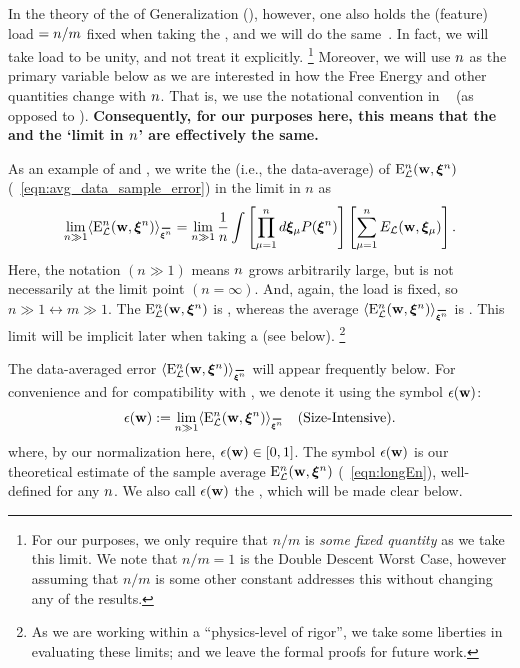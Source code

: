 In the theory of the \StatisticalMechanics of Generalization (\SMOG), however, one also holds the (feature) load $=n/m$ fixed when taking the \ThermodynamicLimit, and we will do the same~\cite{Gardner_1985, SST92, engel2001statistical,MM17_TR}. In fact, we will take load to be unity, and not treat it explicitly. \footnote{For our purposes, we only require that $n/m$ is \emph{some fixed quantity} as we take this limit. We note that $n/m = 1$ is the Double Descent Worst Case, however assuming that $n / m$ is some other constant addresses this without changing any of the results.}
Moreover,  we will use $n$ as the primary variable below as we are interested in how the Free Energy and other quantities change with $n$. That is, we use the notational convention in ~\cite{Solla2023} (as opposed to \cite{SST92}). \textbf{Consequently, for our purposes here, this means that the \ThermodynamicLimit and the `\LargeN limit in $n$' are effectively the same.}

As an example of \SizeExtensivity and \SizeIntensivity, 
we write the \ExpectedValue (i.e., the data-average) of \DataSampleError $\mathbf{\mathrm{E}}^{n}_{\mathcal{L}}(\mathbf{w}, \boldsymbol{\xi}^{n})$ (\EQN~\ref{eqn:avg_data_sample_error})
in the \LargeN limit in $n$ as
\begin{align}
\label{eqn:longEn}
  \lim_{n\gg 1} 
  \langle \DETOPXI\rangle_{\AVGNDXIn}=
  \lim_{n\gg 1}\frac{1}{\ND}
\int \left[ \prod_{\mu=1}^{\ND}d\XI_{\mu}P(\NDXIn) \right]
\left[ \sum_{\mu=1}^{\ND}\DEL(\WVEC,\XI_{\mu}) \right].
\end{align}
Here, the notation $(n \gg 1)$ means $n$ grows arbitrarily large, but is not necessarily
at the limit point $(n=\infty)$. And, again, the load is fixed, so $n\gg 1 \leftrightarrow m \gg 1$.
The \TotalDataSampleError $\mathbf{\mathrm{E}}^{n}_{\mathcal{L}}(\mathbf{w}, \boldsymbol{\xi}^{n})$ is \SizeExtensive, whereas the
average $\langle\DETOPXI\rangle_{\AVGNDXIn}$ is \SizeIntensive.
This limit will be implicit later when taking a \SaddlePointApproximation (see below).
\footnote{As we are working within a ``physics-level of rigor'', we take some liberties in evaluating these \LargeN limits; and we leave the formal proofs for future work.  }

The data-averaged error  $\langle \DETOPXI \rangle_{\AVGNDXIn}$ will appear frequently below.
For convenience and for compatibility with \cite{SST92}, we denote it using the symbol $\epsilon({\mathbf{w}})$:
\begin{align}
 \label{eqn:epsl}
 \EPSLw:=\lim_{n\gg 1}  \langle \DETOPXI \rangle_{\AVGNDXIn} \quad \text{(\SizeIntensive)}.
\end{align}
where, by our normalization here, $\epsilon({\mathbf{w}}) \in [0,1]$.
The symbol $\epsilon({\mathbf{w}})$ is our theoretical estimate of the sample average $\mathbf{\mathrm{E}}^{n}_{\mathcal{L}}(\mathbf{w}, \boldsymbol{\xi}^{n})$ (\EQN~\ref{eqn:longEn}),
well-defined for any $n$.
We also call $\epsilon({\mathbf{w}})$ the \emph{\EffectivePotential}, which will be made clear below.

